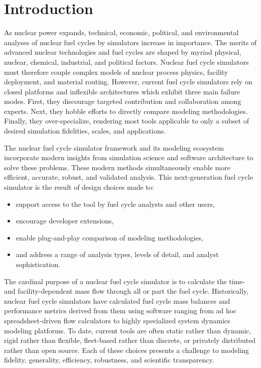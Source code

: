 
\section{Introduction}



As nuclear power expands, technical, economic, political, and environmental
analyses of nuclear fuel cycles by simulators increase in importance. The
merits of advanced nuclear technologies and fuel cycles are
shaped by myriad physical, nuclear, chemical, industrial, and political
factors. Nuclear fuel cycle simulators must therefore couple complex models of
nuclear process physics, facility deployment, and material routing. However,
current fuel cycle simulators rely on closed platforms and inflexible
architectures which exhibit three main failure modes. First, they discourage
targeted contribution and collaboration among experts. Next, they hobble
efforts to directly compare modeling methodologies. Finally, they
over-specialize, rendering most tools applicable to only a subset of desired
simulation fidelities, scales, and applications.

The \Cyclus nuclear fuel cycle simulator framework and its modeling ecosystem
incorporate modern insights from simulation science and software architecture
to solve these problems.  These modern methods simultaneously enable more
efficient, accurate, robust, and validated analysis.  This next-generation fuel
cycle simulator is the result of design choices made to:

\begin{itemize}
\item support access to the tool by fuel cycle analysts and other users,
\item encourage developer extensions,
\item enable plug-and-play comparison of modeling methodologies,
\item and address a range of analysis types, levels of detail, and analyst sophistication.
\end{itemize}

The cardinal purpose of a nuclear fuel cycle simulator is to calculate the
time- and facility-dependent mass flow through all or part the fuel cycle.
Historically, nuclear fuel cycle simulators have calculated fuel cycle mass
balances and performance metrics derived from them using software ranging from
ad hoc spreadsheet-driven flow calculators to highly specialized system
dynamics modeling platforms. To date, current tools are often static rather
than dynamic, rigid rather than flexible, fleet-based rather than discrete, or
privately distributed rather than open source. Each of these choices presents a
challenge to modeling fidelity, generality, efficiency, robustness, and
scientific transparency.


